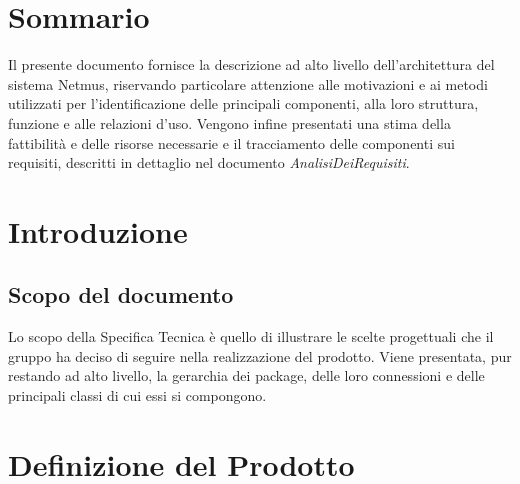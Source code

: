 \tableofcontents

\chapter*{Sommario}
Il presente documento fornisce la descrizione ad alto livello dell'architettura
del sistema Netmus, riservando particolare attenzione alle motivazioni e ai
metodi utilizzati per l'identificazione delle principali componenti, alla loro
struttura, funzione e alle relazioni d'uso. Vengono infine presentati una stima
della fattibilit\`a e delle risorse necessarie e il tracciamento delle
componenti sui requisiti, descritti in dettaglio nel documento
\emph{AnalisiDeiRequisiti}.


\thispagestyle{fancy} %

\chapter{Introduzione}
\thispagestyle{fancy} %

\section{Scopo del documento}
Lo scopo della Specifica Tecnica \`e quello di illustrare le scelte progettuali
che il gruppo ha deciso di seguire nella realizzazione del prodotto. Viene
presentata, pur restando ad alto livello, la gerarchia dei package, delle loro
connessioni e delle principali classi di cui essi si compongono.



\chapter{Definizione del Prodotto}
